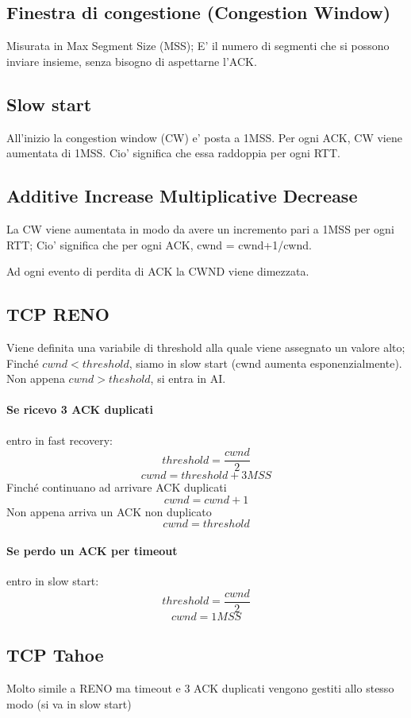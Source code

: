 \subsection{Finestra di congestione (Congestion Window)}
Misurata in Max Segment Size (MSS); E' il numero di segmenti che si possono inviare insieme, senza bisogno di aspettarne l'ACK. %
\subsection{Slow start}
All'inizio la congestion window (CW) e' posta a 1MSS.
Per ogni ACK, CW viene aumentata di 1MSS. Cio' significa che essa raddoppia per ogni RTT.
\subsection{Additive Increase Multiplicative Decrease}
La CW viene aumentata in modo da avere un incremento pari a 1MSS per ogni RTT;
Cio' significa che per ogni ACK, cwnd = cwnd+1/cwnd.

Ad ogni evento di perdita di ACK la CWND viene dimezzata.
\subsection{TCP RENO}
Viene definita una variabile di threshold alla quale viene assegnato un valore alto;
Finché $cwnd < threshold$, siamo in slow start (cwnd aumenta esponenzialmente).\newline
Non appena $cwnd > theshold$, si entra in AI.
\paragraph{Se ricevo 3 ACK duplicati} entro in fast recovery:
\[ threshold = \dfrac{cwnd}{2} \]
\[ cwnd = threshold + 3MSS \]
Finché continuano ad arrivare ACK duplicati
\[ cwnd = cwnd + 1 \]
Non appena arriva un ACK non duplicato
\[ cwnd = threshold \]
\paragraph{Se perdo un ACK per timeout} entro in slow start:
\[ threshold = \dfrac{cwnd}{2} \]
\[ cwnd = 1MSS \]
\subsection{TCP Tahoe}
Molto simile a RENO ma timeout e 3 ACK duplicati vengono gestiti allo stesso modo (si va in slow start)
